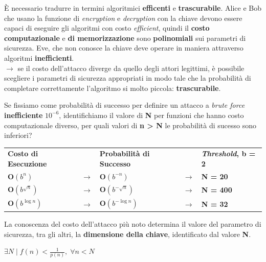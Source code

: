 \begin{flushleft}
    È necessario tradurre in termini algoritmici \textbf{efficenti} e \textbf{trascurabile}. Alice e Bob che usano la funzione di \textit{encryption} e \textit{decryption} con la chiave devono essere capaci di eseguire gli algoritmi con costo \textit{efficient}, quindi il \textbf{costo computazionale} e \textbf{di memorizzazione} sono \textbf{polinomiali} sui parametri di sicurezza. Eve, che non conosce la chiave deve operare in maniera attraverso algoritmi \textbf{inefficienti}. \\
    $\rightarrow$ se il costo dell'attacco diverge da quello degli attori legittimi, è possibile scegliere i parametri di sicurezza appropriati in modo tale che la probabilità di completare correttamente l'algoritmo si molto piccola: \textbf{trascurabile}. 
\end{flushleft}

\begin{flushleft}
    Se fissiamo come probabilità di successo per definire un attacco a \textit{brute force} \textbf{inefficiente} $10^{-6}$, identifichiamo il valore di \textbf{N} per funzioni che hanno costo computazionale diverso, per quali valori di \textbf{n > N} le probabilità di sucesso sono inferiori?

    \begin{center}
        \begin{tabular}{lllll}
            \textbf{Costo di Esecuzione} && \textbf{Probabilità di Successo} && \textbf{\textit{Threshold}, b = 2} \\
            $\mathbf{O}(b^n)$ & $\rightarrow$ & $\mathbf{O}(b^{-n})$ & $\rightarrow$ & \textbf{N = 20} \\
            $\mathbf{O}(b^{\sqrt{n}})$ & $\rightarrow$ & $\mathbf{O}(b^{- \sqrt{n}})$ & $\rightarrow$ & \textbf{N = 400} \\
            $\mathbf{O}(b^{\log n})$ & $\rightarrow$ & $\mathbf{O}(b^{- \log n})$ & $\rightarrow$ & \textbf{N = 32}
        \end{tabular}
    \end{center}
    La conoscenza del costo dell'attacco più noto determina il valore del parametro di sicurezza, tra gli altri, la \textbf{dimensione della chiave}, identificato dal valore \textbf{N}.

    {\centering
        $\exists N \; | \; f(n) < \frac{1}{p(n)}, \; \forall n < N$
    \par}
\end{flushleft}

